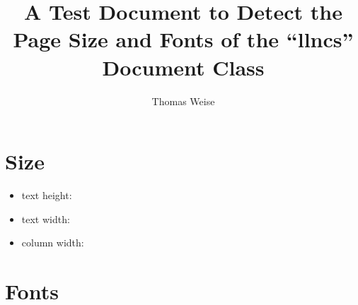 \documentclass{llncs}%
\begin{document}
%
%
\title{A Test Document to Detect the Page Size and Fonts of the ``llncs'' Document Class}%
\author{Thomas Weise}%
%
\maketitle%
%
%
\section{Size}%
%
\begin{itemize}%
\item text height: \the\textheight%
\item text width: \the\textwidth%
\item column width: \the\columnwidth%
\end{itemize}%
%
\section{Fonts}%
%
\end{document}
